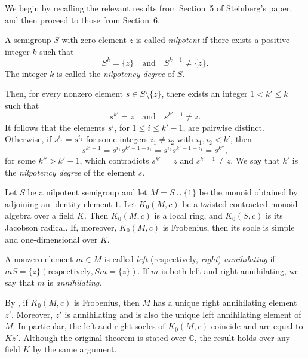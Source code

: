 \documentclass[11pt,reqno]{amsart}
\theoremstyle{plain}
\theoremstyle{remark}
\theoremstyle{definition}
\begin{document}
We begin by recalling the relevant results from Section~5 of Steinberg’s paper, and then proceed to those from Section~6.


A semigroup $S$ with zero element $z$ is called \emph{nilpotent} if there exists a positive integer $k$ such that
\[
S^k = \{z\}
\quad \text{and} \quad
S^{k-1} \neq \{z\}.
\]
The integer $k$ is called the \emph{nilpotency degree} of $S$.

Then, for every nonzero element $s \in S \setminus \{z\}$, there exists an integer $1<k' \le k$ such that
\[
s^{k'} = z \quad \text{and} \quad s^{k'-1} \neq z.
\]
It follows that the elements $s^i$, for $1 \le i \le k'-1$, are pairwise distinct. Otherwise, if $s^{i_1} = s^{i_2}$ for some integers $i_1 \neq i_2$ with $i_1, i_2 < k'$, then
\[
s^{k'-1} = s^{i_1} s^{k'-1-i_1} = s^{i_2} s^{k'-1-i_1} = s^{k''},
\]
for some $k'' > k'-1$, which contradicts $s^{k''} = z$ and $s^{k'-1} \neq z$. We say that $k'$ is the \emph{nilpotency degree} of the element $s$.

Let $S$ be a nilpotent semigroup and let $M = S \cup \{1\}$ be the monoid obtained by adjoining an identity element $1$. %
Let $K_0(M,c)$ be a twisted contracted monoid algebra over a field $K$. Then $K_0(M,c)$ is a local ring, and $K_0(S,c)$ is its Jacobson radical. 
If, moreover, $K_0(M,c)$ is Frobenius, then its socle is simple and one-dimensional over $K$.

A nonzero element $m \in M$ is called
 \emph{left} (respectively,  \emph{right}) \emph{annihilating} if 
\(
mS = \{z\} (\text{respectively}, Sm =\{z\}).
\)
If $m$ is both left and right annihilating, we say that $m$ is \emph{annihilating}.

By \cite[Proposition~5.1]{Ste-Fac-det}, if $K_0(M,c)$ is Frobenius, then $M$ has a unique right annihilating element $z'$. Moreover, $z'$ is annihilating and is also the unique left annihilating element of $M$. In particular, the left and right socles of $K_0(M,c)$ coincide and are equal to $K z'$. Although the original theorem is stated over $\mathbb{C}$, the result holds over any field $K$ by the same argument.
\end{document}
